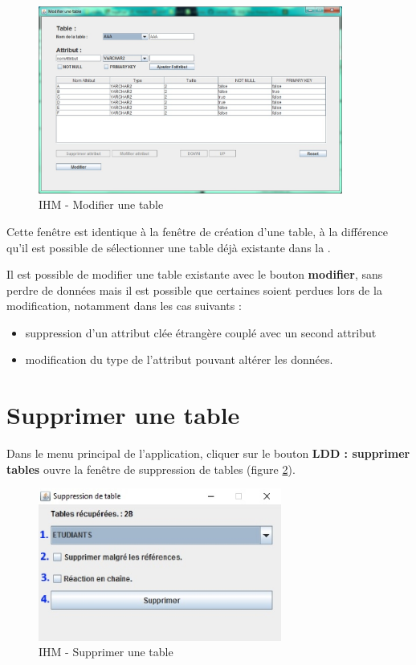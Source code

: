 \begin{figure}[!h]
\centering
\includegraphics[width=10cm]{./images/manuel/modifier_tables.eps}
\caption{IHM - Modifier une table}
\label{modifier_table_gui}
\end{figure}

Cette fenêtre est identique à la fenêtre de création d'une table, à la différence qu'il est possible de sélectionner une table déjà existante dans la \bdd. 

Il est possible de modifier une table existante avec le bouton \textbf{modifier}, sans perdre de données mais il est possible que certaines soient perdues lors de la modification, notamment dans les cas suivants :
\begin{itemize}
\item suppression d'un attribut clée étrangère couplé avec un second attribut
\item modification du type de l'attribut pouvant altérer les données.
\end{itemize}





\section{Supprimer une table}
Dans le menu principal de l'application, cliquer sur le bouton \textbf{LDD : supprimer tables} ouvre la fen\^etre de suppression de tables (figure \ref{supprimer_table_gui}).

\begin{figure}[!h]
\centering
\includegraphics[width=8cm]{./images/manuel/supprimer_table.eps}
\caption{IHM - Supprimer une table}
\label{supprimer_table_gui}
\end{figure}

